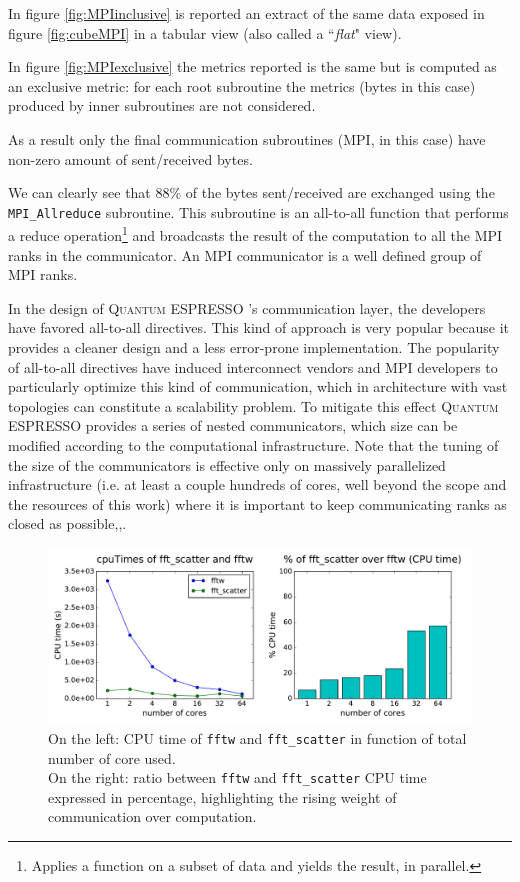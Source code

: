 \documentclass[a4paper,12pt]{article}
\newcommand\QE{\textsc{Quantum} ESPRESSO }
\begin{document}
In figure \ref{fig:MPIinclusive} is reported an extract of the same data exposed in figure \ref{fig:cubeMPI} in a tabular view (also called a ``\textit{flat}" view).

In figure \ref{fig:MPIexclusive} the metrics reported is the same but is computed as an exclusive metric: for each root subroutine the metrics (bytes in this case) produced by inner subroutines are not considered.

As a result only the final communication subroutines (MPI, in this case) have non-zero amount of sent/received bytes.

We can clearly see that 88\% of the bytes sent/received are exchanged using the \texttt{MPI\_Allreduce} subroutine.
This subroutine is an all-to-all function that performs a reduce operation\footnote{Applies a function on a subset of data and yields the result, in parallel.} and broadcasts the result of the computation to all the MPI ranks in the communicator. An MPI communicator is a well defined group of MPI ranks.

In the design of \QE's communication layer, the developers have favored all-to-all directives. 
This kind of approach is very popular because it provides a cleaner design and a less error-prone implementation.
The popularity of all-to-all directives have induced interconnect vendors and MPI developers to particularly optimize this kind of communication, which in architecture with vast topologies can constitute a scalability problem.
To mitigate this effect \QE provides a series of nested communicators, which size can be modified according to the computational infrastructure. 
Note that the tuning of the size of the communicators is effective only on massively parallelized infrastructure (i.e. at least a couple hundreds of cores, well beyond the scope and the resources of this work) where it is important to keep communicating ranks as closed as possible\cite{QE},\cite{QE2},\cite{prace}.


\begin{figure}[hhh!]
	\centerline{\includegraphics[width=1.2\linewidth]{fftw_vs_fft_scatter.pdf}}
	\caption{ On the left: CPU time of \texttt{fftw} and \texttt{fft\_scatter} in function of total number of core used.
	\\On the right: ratio between \texttt{fftw} and \texttt{fft\_scatter} CPU time expressed in percentage, highlighting the rising weight of communication over computation.
	}
	\label{fig:fftwvsfftscatter}
\end{figure}
\end{document}
